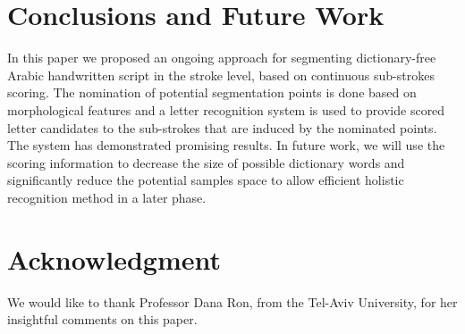 \documentclass[10pt, conference, compsocconf]{IEEEtran}
\begin{document}
\section{Conclusions and Future Work}
In this paper we proposed an ongoing approach for segmenting dictionary-free Arabic handwritten script in the stroke level, based on continuous sub-strokes scoring. The nomination of potential segmentation points is done based on morphological features and a letter recognition system is used to provide scored letter candidates to the sub-strokes that are induced by the nominated points. The  system has demonstrated promising results.
In future work, we will use the scoring information to decrease the size of possible dictionary words and significantly reduce the potential samples space to allow efficient holistic recognition method in a later phase. \\ 

\section{Acknowledgment}
We would like to thank Professor Dana Ron, from the Tel-Aviv University, for her insightful comments on this paper. \\



\end{document}

